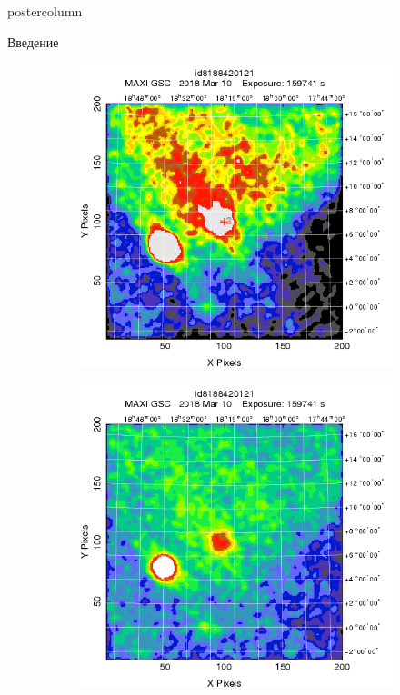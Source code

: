 \documentclass{beamer}
\begin{document}
\begin{frame}
\begin{columns}
\begin{column}{.43\textwidth}
\begin{beamercolorbox}[center]{postercolumn}
\begin{minipage}{.98\textwidth}
{\begin{myblock}{Введение}
						\begin{figure}[h!]
							\centering
							\begin{subfigure}[b]{0.4\linewidth}
								\includegraphics[width = \textwidth]{pictures/maxij_image_full.png}
								\caption{}
								\label{img:bhfull}
							\end{subfigure}
							\begin{subfigure}[b]{0.4\linewidth}
								\centering
								\includegraphics[width = \textwidth]{pictures/maxij_image.png}

\end{subfigure}
\end{figure}
\end{myblock}}
\end{minipage}
\end{beamercolorbox}
\end{column}
\end{columns}
\end{frame}
\end{document}
